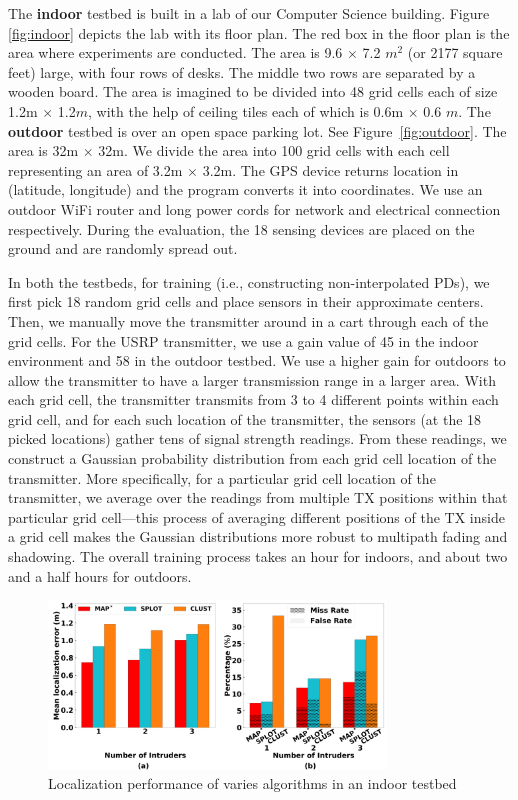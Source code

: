  The {\bf indoor} testbed is built in a lab of our
Computer Science building.  Figure \ref{fig:indoor} depicts the lab
with its floor plan. The red box in the floor plan is the area where
experiments are conducted. The area is 9.6 $\times$ 7.2 $m^2$ (or 2177
square feet) large, with four rows of desks. The middle two rows
are separated by a wooden board. The area is imagined to be divided
into 48 grid cells each of size 1.2m $\times$ 1.2$m$, with the help of
ceiling tiles each of which is 0.6m $\times$ 0.6 $m$. 
The {\bf outdoor} testbed is over an open space parking lot.  See
Figure~\ref{fig:outdoor}. The area is 32m $\times$ 32m. We divide the
area into 100 grid cells with each cell representing an area of 3.2m
$\times$ 3.2m. The GPS device returns location in (latitude,
longitude) and the program converts it into coordinates. We use an
outdoor WiFi router and long power cords for network and electrical
connection respectively.
During the evaluation, the 18 sensing devices are placed on the ground
and are randomly spread out.


 In both the testbeds, for training (i.e.,
constructing non-interpolated PDs), we first pick 18 random grid cells
and place sensors in their approximate centers. Then, we manually move
the transmitter around in a cart through each of the grid cells. For
the USRP transmitter, we use a gain value of 45 in the indoor
environment and 58 in the outdoor testbed. We use a higher gain for
outdoors to allow the transmitter to have a larger transmission range
in a larger area.
With each grid cell, the transmitter transmits from 3 to 4 different
points within each grid cell, and for each such location of the
transmitter, the sensors (at the 18 picked locations) gather tens of
signal strength readings. From these readings, we construct a Gaussian
probability distribution from each grid cell location of the
transmitter.
More specifically, for a particular grid cell location of the
transmitter, we average over the readings from multiple TX positions
within that particular grid cell---this process of averaging different
positions of the TX inside a grid cell makes the Gaussian
distributions more robust to multipath fading and shadowing. The
overall training process takes an hour for indoors, and about two and
a half hours for outdoors.

\begin{figure}[ht]
	\centering
	\includegraphics[width=0.8\textwidth]{chapters/ipsn/figures/indoor-error-missfalse.png}
	\caption{Localization performance of varies algorithms in an indoor testbed}
	\label{fig:indoor-error-miss-false}
\end{figure}

